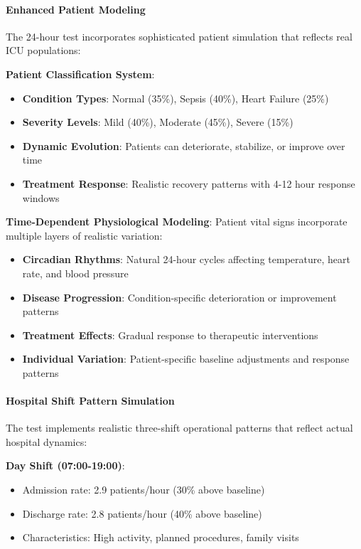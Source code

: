 \paragraph{Enhanced Patient Modeling}
The 24-hour test incorporates sophisticated patient simulation that reflects real ICU populations:

\textbf{Patient Classification System}:
\begin{itemize}
    \item \textbf{Condition Types}: Normal (35\%), Sepsis (40\%), Heart Failure (25\%)
    \item \textbf{Severity Levels}: Mild (40\%), Moderate (45\%), Severe (15\%)
    \item \textbf{Dynamic Evolution}: Patients can deteriorate, stabilize, or improve over time
    \item \textbf{Treatment Response}: Realistic recovery patterns with 4-12 hour response windows
\end{itemize}

\textbf{Time-Dependent Physiological Modeling}:
Patient vital signs incorporate multiple layers of realistic variation:
\begin{itemize}
    \item \textbf{Circadian Rhythms}: Natural 24-hour cycles affecting temperature, heart rate, and blood pressure
    \item \textbf{Disease Progression}: Condition-specific deterioration or improvement patterns
    \item \textbf{Treatment Effects}: Gradual response to therapeutic interventions
    \item \textbf{Individual Variation}: Patient-specific baseline adjustments and response patterns
\end{itemize}

\paragraph{Hospital Shift Pattern Simulation}
The test implements realistic three-shift operational patterns that reflect actual hospital dynamics:

\textbf{Day Shift (07:00-19:00)}:
\begin{itemize}
    \item Admission rate: 2.9 patients/hour (30\% above baseline)
    \item Discharge rate: 2.8 patients/hour (40\% above baseline)
    \item Characteristics: High activity, planned procedures, family visits
\end{itemize}

